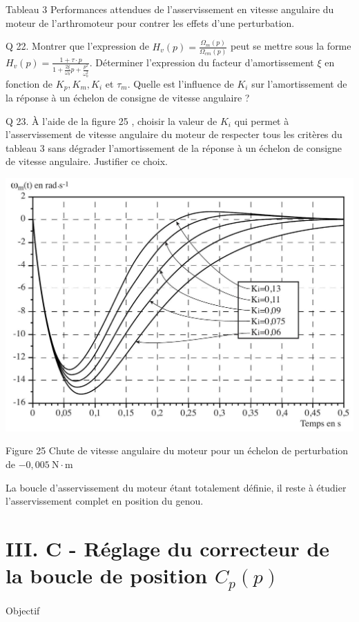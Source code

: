 \documentclass[10pt]{article}
\begin{document}
Tableau 3 Performances attendues de l'asservissement en vitesse angulaire du moteur de l'arthromoteur pour contrer les effets d'une perturbation.

Q 22. Montrer que l'expression de $H_{v}(p)=\frac{\Omega_{m}(p)}{\Omega_{c m}(p)}$ peut se mettre sous la forme $H_{v}(p)=\frac{1+\tau \cdot p}{1+\frac{2 \xi}{\omega_{0}} p+\frac{p^{2}}{\omega_{0}^{2}}}$. Déterminer l'expression du facteur d'amortissement $\xi$ en fonction de $K_{p}, K_{m}, K_{i}$ et $\tau_{m}$. Quelle est l'influence de $K_{i}$ sur l'amortissement de la réponse à un échelon de consigne de vitesse angulaire ?

Q 23. À l'aide de la figure 25 , choisir la valeur de $K_{i}$ qui permet à l'asservissement de vitesse angulaire du moteur de respecter tous les critères du tableau 3 sans dégrader l'amortissement de la réponse à un échelon de consigne de vitesse angulaire. Justifier ce choix.

\begin{center}
\includegraphics[max width=\textwidth]{2024_07_14_a83aebba33898893d39fg-15(1)}
\end{center}

Figure 25 Chute de vitesse angulaire du moteur pour un échelon de perturbation de $-0,005 \mathrm{~N} \cdot \mathrm{m}$

La boucle d'asservissement du moteur étant totalement définie, il reste à étudier l'asservissement complet en position du genou.

\section*{III. C - Réglage du correcteur de la boucle de position $C_{p}(p)$}
Objectif
\end{document}
